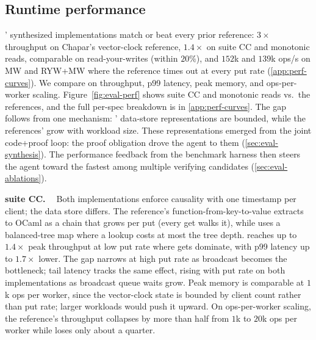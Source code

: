 \subsection{Runtime performance}
\label{sec:eval-perf}

\sys{}' synthesized implementations match or beat every prior reference: $3\times$ throughput on Chapar's vector-clock reference, $1.4\times$ on \sys{} suite CC and monotonic reads, comparable on read-your-writes (within $20\%$), and $152$k and $139$k ops/s on MW and RYW+MW where the reference times out at every put rate (\cref{app:perf-curves}). We compare on throughput, p99 latency, peak memory, and ops-per-worker scaling. Figure~\ref{fig:eval-perf} shows \sys{} suite CC and monotonic reads vs.\ the references, and 
the full per-spec breakdown
is in \cref{app:perf-curves}. The gap follows from one mechanism: 
\sys{}' data-store representations are bounded,
while the references' grow with workload size. These representations emerged from the joint code+proof loop: the proof obligation drove the agent to them (\cref{sec:eval-synthesis}). The performance feedback from the benchmark harness then steers the agent toward the fastest among multiple verifying candidates (\cref{sec:eval-ablations}).

\textbf{\sys{} suite CC. \ }
Both implementations enforce causality with one timestamp per client; the data store differs. The reference's function-from-key-to-value extracts to OCaml as a chain that grows per put (every get walks it), while \sys{} uses a balanced-tree map where a lookup costs at most the tree depth. \sys{} reaches up to $1.4\times$ peak throughput at low put rate where gets dominate, with p99 latency up to $1.7\times$ lower. 
The gap narrows at high put rate as broadcast becomes the bottleneck; tail latency tracks the same effect, rising with put rate on both implementations as broadcast queue waits grow. Peak memory is comparable at $1$k ops per worker, since the vector-clock state is bounded by client count rather than put rate; larger workloads would push it upward. On ops-per-worker scaling, the reference's throughput collapses by more than half from $1$k to $20$k ops per worker while \sys{} loses only about a quarter.


